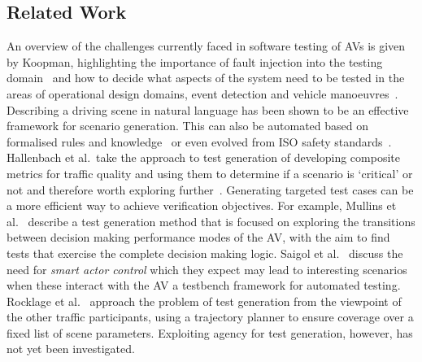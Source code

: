 \documentclass[letterpaper, 10 pt, journal, twoside]{IEEEtran}
\begin{document}
\subsection{Related Work}\label{s:background}

An overview of the challenges currently faced in software testing of AVs is given by Koopman, highlighting the importance of fault injection into the testing domain~\cite{Koopman2016} and how to decide what aspects of the system need to be tested in the areas of operational design domains, event detection and vehicle manoeuvres~\cite{Koopman2019}. 
%
Describing a driving scene in natural language has been shown to be an effective framework for scenario generation. This can also be automated based on formalised rules and knowledge~\cite{Bagschik2018} or even evolved from ISO safety standards~\cite{Menzel2018}. 
%
Hallenbach et al.\ take the approach to test generation of developing composite metrics for traffic quality and using them to determine if a scenario is `critical' or not and therefore worth exploring further~\cite{Hallerbach2018}. 
%
Generating targeted test cases can be a more efficient way to achieve verification objectives. 
%
For example, Mullins et al.~\cite{Mullins2018} describe a test generation method that is focused on exploring the transitions between decision making performance modes of the AV, with the aim to find tests that exercise the complete decision making logic. 
%
Saigol et al.~\cite{Saigol2018} discuss the need for \textit{smart actor control} which they expect may lead to interesting scenarios when these interact with the AV a testbench framework for automated testing. 
%
Rocklage et al.~\cite{Rocklage2017} approach the problem of test generation from the viewpoint of the other traffic participants, using a trajectory planner to ensure coverage over a fixed list of scene parameters.
%
Exploiting agency for test generation, however, has not yet been investigated. 

\end{document}
